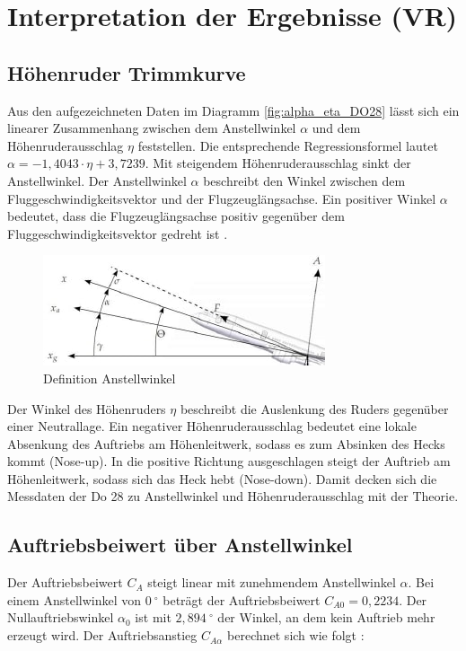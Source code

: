 \chapter{Interpretation der Ergebnisse (VR)}

\section{Höhenruder Trimmkurve}

Aus den aufgezeichneten Daten im Diagramm \ref{fig:alpha_eta_DO28} lässt sich ein linearer Zusammenhang zwischen dem Anstellwinkel $\alpha$ und dem 
Höhenruderausschlag $\eta$ feststellen. Die entsprechende Regressionsformel lautet $\alpha = -1,4043 \cdot \eta + 3,7239$. Mit steigendem Höhenruderausschlag sinkt der Anstellwinkel. 
Der Anstellwinkel $\alpha$ beschreibt den Winkel zwischen dem Fluggeschwindigkeitsvektor und der Flugzeuglängsachse. Ein positiver Winkel $\alpha$ bedeutet, dass die Flugzeuglängsachse positiv gegenüber dem Fluggeschwindigkeitsvektor gedreht ist \cite{Skript}. 

\begin{figure}[h]
		\includegraphics{./Bilder/Anstellwinkel_Definition.jpg}
	\caption{Definition Anstellwinkel}
	\label{alpha_def}
\end{figure}

Der Winkel des Höhenruders $\eta$ beschreibt die Auslenkung des Ruders gegenüber einer Neutrallage. Ein negativer 
Höhenruderausschlag bedeutet eine lokale Absenkung des Auftriebs am Höhenleitwerk, sodass es zum Absinken des Hecks kommt (Nose-up). In die positive Richtung ausgeschlagen steigt der Auftrieb am Höhenleitwerk, sodass sich das Heck hebt (Nose-down). 
Damit decken sich die Messdaten der Do 28 zu Anstellwinkel und Höhenruderausschlag mit der Theorie.




\section{Auftriebsbeiwert über Anstellwinkel}

Der Auftriebsbeiwert $C_A$ steigt linear mit zunehmendem Anstellwinkel $\alpha$. Bei einem Anstellwinkel von $0 \ ^{\circ}$ beträgt der Auftriebsbeiwert $C_{A0}=0,2234$. Der Nullauftriebswinkel $\alpha_{0}$ ist mit $2,894 \ ^{\circ}$ der Winkel, an dem kein Auftrieb mehr erzeugt wird. Der Auftriebsanstieg $C_{A\alpha}$ berechnet sich wie folgt \cite{Skript}:

